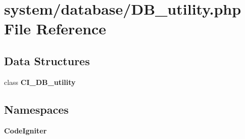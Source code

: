 \section{system/database/\-D\-B\-\_\-utility.php File Reference}
\label{_d_b__utility_8php}
\subsection*{Data Structures}
\begin{DoxyCompactItemize}
\item 
class {\bf C\-I\-\_\-\-D\-B\-\_\-utility}
\end{DoxyCompactItemize}
\subsection*{Namespaces}
\begin{DoxyCompactItemize}
\item 
{\bf Code\-Igniter}
\end{DoxyCompactItemize}
